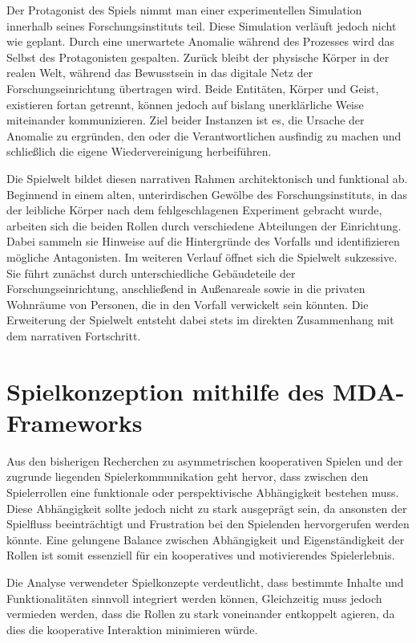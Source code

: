 Der Protagonist des Spiels nimmt man einer experimentellen Simulation innerhalb seines Forschungsinstituts teil. Diese Simulation verläuft jedoch nicht wie geplant. Durch eine unerwartete Anomalie während des Prozesses wird das Selbst des Protagonisten gespalten. Zurück bleibt der physische Körper in der realen Welt, während das Bewusstsein in das digitale Netz der Forschungseinrichtung übertragen wird. Beide Entitäten, Körper und Geist, existieren fortan getrennt, können jedoch auf bislang unerklärliche Weise miteinander kommunizieren. Ziel beider Instanzen ist es, die Ursache der Anomalie zu ergründen, den oder die Verantwortlichen ausfindig zu machen und schließlich die eigene Wiedervereinigung herbeiführen.

Die Spielwelt bildet diesen narrativen Rahmen architektonisch und funktional ab. Beginnend in einem alten, unterirdischen Gewölbe des Forschungsinstituts, in das der leibliche Körper nach dem fehlgeschlagenen Experiment gebracht wurde, arbeiten sich die beiden Rollen durch verschiedene Abteilungen der Einrichtung. Dabei sammeln sie Hinweise auf die Hintergründe des Vorfalls und identifizieren mögliche Antagonisten. Im weiteren Verlauf öffnet sich die Spielwelt sukzessive. Sie führt zunächst durch unterschiedliche Gebäudeteile der Forschungseinrichtung, anschließend in Außenareale sowie in die privaten Wohnräume von Personen, die in den Vorfall verwickelt sein könnten. Die Erweiterung der Spielwelt entsteht dabei stets im direkten Zusammenhang mit dem narrativen Fortschritt.


\section{Spielkonzeption mithilfe des MDA-Frameworks}

Aus den bisherigen Recherchen zu asymmetrischen kooperativen Spielen und der zugrunde liegenden Spielerkommunikation geht hervor, dass zwischen den Spielerrollen eine funktionale oder perspektivische Abhängigkeit bestehen muss. Diese Abhängigkeit sollte jedoch nicht zu stark ausgeprägt sein, da ansonsten der Spielfluss beeinträchtigt und Frustration bei den Spielenden hervorgerufen werden könnte. Eine gelungene Balance zwischen Abhängigkeit und Eigenständigkeit der Rollen ist somit essenziell für ein kooperatives und motivierendes Spielerlebnis.

Die Analyse verwendeter Spielkonzepte verdeutlicht, dass bestimmte Inhalte und Funktionalitäten sinnvoll integriert werden können, Gleichzeitig muss jedoch vermieden werden, dass die Rollen zu stark voneinander entkoppelt agieren, da dies die kooperative Interaktion minimieren würde.

